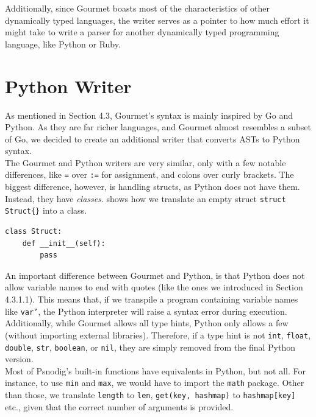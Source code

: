 Additionally, since Gourmet boasts most of the characteristics of other dynamically typed languages, the writer serves as a pointer to how much effort it might take to write a parser for another dynamically typed programming language, like Python or Ruby.

\section{Python Writer}

As mentioned in Section 4.3, Gourmet's syntax is mainly inspired by Go and Python. As they are far richer languages, and Gourmet almost resembles a subset of Go, we decided to create an additional writer that converts ASTs to Python syntax. \\

The Gourmet and Python writers are very similar, only with a few notable differences, like \texttt{=} over \texttt{:=} for assignment, and colons over curly brackets. The biggest difference, however, is handling structs, as Python does not have them. Instead, they have \textit{classes}.  shows how we translate an empty struct \texttt{struct Struct\{\}} into a class. \\

\begin{lstlisting}[caption={The Python equivalent of an empty struct in Gourmet.}, captionpos=b, label={The Python equivalent of an empty struct in Gourmet.}]
class Struct:
    def __init__(self):
        pass
\end{lstlisting}

An important difference between Gourmet and Python, is that Python does not allow variable names to end with quotes (like the ones we introduced in Section 4.3.1.1). This means that, if we transpile a program containing variable names like \texttt{var'}, the Python interpreter will raise a syntax error during execution. \\

Additionally, while Gourmet allows all type hints, Python only allows a few (without importing external libraries). Therefore, if a type hint is not \texttt{int}, \texttt{float}, \texttt{double}, \texttt{str}, \texttt{boolean}, or \texttt{nil}, they are simply removed from the final Python version. \\

Most of Psnodig's built-in functions have equivalents in Python, but not all. For instance, to use \texttt{min} and \texttt{max}, we would have to import the \texttt{math} package. Other than those, we translate \texttt{length} to \texttt{len}, \texttt{get(key, hashmap)} to \texttt{hashmap[key]} etc., given that the correct number of arguments is provided. \\

